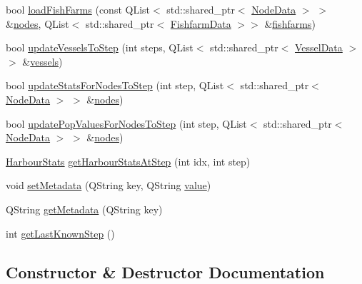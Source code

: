 \begin{DoxyCompactItemize}
\item 
bool \mbox{\hyperlink{class_db_helper_ade6c4c084b6076cc6d207690c0f47121}{load\+Fish\+Farms}} (const Q\+List$<$ std\+::shared\+\_\+ptr$<$ \mbox{\hyperlink{class_node_data}{Node\+Data}} $>$ $>$ \&\mbox{\hyperlink{thread__vessels_8cpp_ace5675146c8515428d094fd142d8a2d2}{nodes}}, Q\+List$<$ std\+::shared\+\_\+ptr$<$ \mbox{\hyperlink{class_fishfarm_data}{Fishfarm\+Data}} $>$$>$ \&\mbox{\hyperlink{simulator_2main_8cpp_a2c8b011098d3755d1d7580bbd2c0ed26}{fishfarms}})
\item 
bool \mbox{\hyperlink{class_db_helper_a9ac40eb29893a6e33fed981d490c037b}{update\+Vessels\+To\+Step}} (int steps, Q\+List$<$ std\+::shared\+\_\+ptr$<$ \mbox{\hyperlink{class_vessel_data}{Vessel\+Data}} $>$ $>$ \&\mbox{\hyperlink{thread__vessels_8cpp_a5c62ccf0a525f019531241e5659bd511}{vessels}})
\item 
bool \mbox{\hyperlink{class_db_helper_a4dea6149cb96f9da25635278d7cd9fa0}{update\+Stats\+For\+Nodes\+To\+Step}} (int step, Q\+List$<$ std\+::shared\+\_\+ptr$<$ \mbox{\hyperlink{class_node_data}{Node\+Data}} $>$ $>$ \&\mbox{\hyperlink{thread__vessels_8cpp_ace5675146c8515428d094fd142d8a2d2}{nodes}})
\item 
bool \mbox{\hyperlink{class_db_helper_af78f6e35dd87d9b0729925aeae977e2c}{update\+Pop\+Values\+For\+Nodes\+To\+Step}} (int step, Q\+List$<$ std\+::shared\+\_\+ptr$<$ \mbox{\hyperlink{class_node_data}{Node\+Data}} $>$ $>$ \&\mbox{\hyperlink{thread__vessels_8cpp_ace5675146c8515428d094fd142d8a2d2}{nodes}})
\item 
\mbox{\hyperlink{class_harbour_stats}{Harbour\+Stats}} \mbox{\hyperlink{class_db_helper_a89a83b296e55826579decec1d9cbb260}{get\+Harbour\+Stats\+At\+Step}} (int idx, int step)
\item 
void \mbox{\hyperlink{class_db_helper_a9702ee4b770976d71c21d3ba1f5c888e}{set\+Metadata}} (Q\+String key, Q\+String \mbox{\hyperlink{diffusion_8cpp_a4b41795815d9f3d03abfc739e666d5da}{value}})
\item 
Q\+String \mbox{\hyperlink{class_db_helper_a84b8f8be38a78f95449c2c1b3f3f59f4}{get\+Metadata}} (Q\+String key)
\item 
int \mbox{\hyperlink{class_db_helper_ae893a2d28952f0762b2c34648c39888c}{get\+Last\+Known\+Step}} ()
\end{DoxyCompactItemize}


\subsection{Constructor \& Destructor Documentation}
\mbox{\label{class_db_helper_ad5a6885723180ba8891634870af52a93}} 
